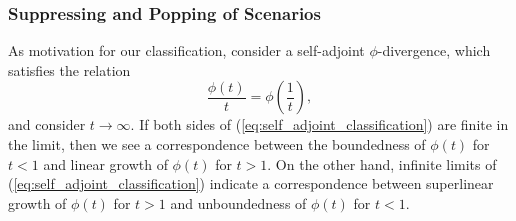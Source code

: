 \documentclass[opre,nonblindrev]{informs3} %
\begin{document}
\subsubsection{Suppressing and Popping of Scenarios}
\label{sssec:suppressandpop}

As motivation for our classification, consider a self-adjoint $\phi$-divergence, which satisfies the relation
\begin{equation} \label{eq:self_adjoint_classification}
	\frac{\phi(t)}{t} = \phi\left(\frac{1}{t}\right),
\end{equation}
and consider $t \rightarrow \infty$.
If both sides of (\ref{eq:self_adjoint_classification}) are finite in the limit, then we see a correspondence between the boundedness of $\phi(t)$ for $t < 1$ and linear growth of $\phi(t)$ for $t > 1$.
On the other hand, infinite limits of (\ref{eq:self_adjoint_classification}) indicate a correspondence between superlinear growth of $\phi(t)$ for $t > 1$ and unboundedness of $\phi(t)$ for $t < 1$.
\end{document}
